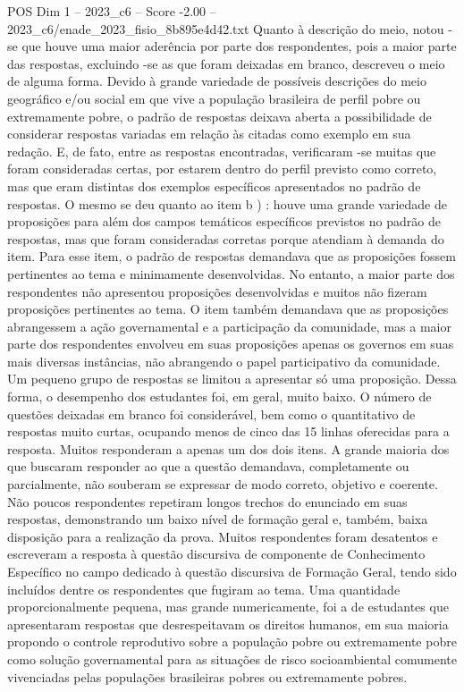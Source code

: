 \begin{textsample}{POS Dim 1 – 2023\_c6 – Score -2.00 – 2023\_c6/enade\_2023\_fisio\_8b895e4d42.txt}
Quanto à descrição do meio, notou -se que houve uma maior aderência por parte dos respondentes, pois a maior parte das respostas, excluindo -se as que foram deixadas em branco, descreveu o meio de alguma forma.
Devido à grande variedade de possíveis descrições do meio geográfico e/ou social em que vive a população brasileira de perfil pobre ou extremamente pobre, o padrão de respostas deixava aberta a possibilidade de considerar respostas variadas em relação às citadas como exemplo em sua redação.
E, de fato, entre as respostas encontradas, verificaram -se muitas que foram consideradas certas, por estarem dentro do perfil previsto como correto, mas que eram distintas dos exemplos específicos apresentados no padrão de respostas.
O mesmo se deu quanto ao item b ) : houve uma grande variedade de proposições para além dos campos temáticos específicos previstos no padrão de respostas, mas que foram consideradas corretas porque atendiam à demanda do item.
Para esse item, o padrão de respostas demandava que as proposições fossem pertinentes ao tema e minimamente desenvolvidas.
No entanto, a maior parte dos respondentes não apresentou proposições desenvolvidas e muitos não fizeram proposições pertinentes ao tema.
O item também demandava que as proposições abrangessem a ação governamental e a participação da comunidade, mas a maior parte dos respondentes envolveu em suas proposições apenas os governos em suas mais diversas instâncias, não abrangendo o papel participativo da comunidade.
Um pequeno grupo de respostas se limitou a apresentar só uma proposição.
Dessa forma, o desempenho dos estudantes foi, em geral, muito baixo.
O número de questões deixadas em branco foi considerável, bem como o quantitativo de respostas muito curtas, ocupando menos de cinco das 15 linhas oferecidas para a resposta.
Muitos responderam a apenas um dos dois itens.
A grande maioria dos que buscaram responder ao que a questão demandava, completamente ou parcialmente, não souberam se expressar de modo correto, objetivo e coerente.
Não poucos respondentes repetiram longos trechos do enunciado em suas respostas, demonstrando um baixo nível de formação geral e, também, baixa disposição para a realização da prova.
Muitos respondentes foram desatentos e escreveram a resposta à questão discursiva de componente de Conhecimento Específico no campo dedicado à questão discursiva de Formação Geral, tendo sido incluídos dentre os respondentes que fugiram ao tema.
Uma quantidade proporcionalmente pequena, mas grande numericamente, foi a de estudantes que apresentaram respostas que desrespeitavam os direitos humanos, em sua maioria propondo o controle reprodutivo sobre a população pobre ou extremamente pobre como solução governamental para as situações de risco socioambiental comumente vivenciadas pelas populações brasileiras pobres ou extremamente pobres.

\end{textsample}
